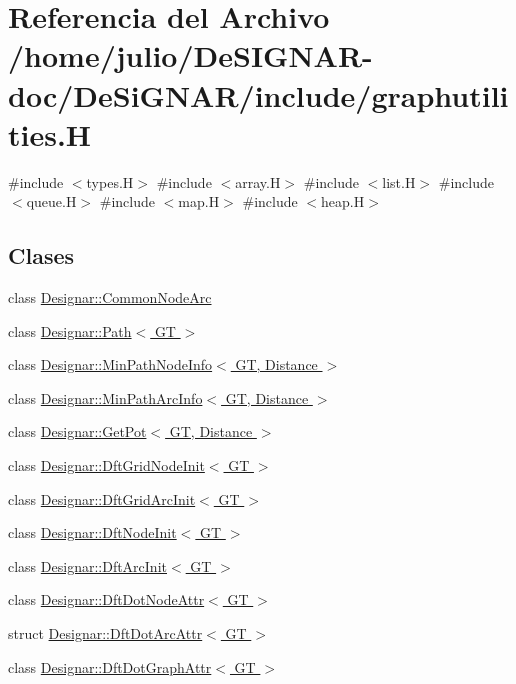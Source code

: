 \hypertarget{graphutilities_8_h}{}\section{Referencia del Archivo /home/julio/\+De\+S\+I\+G\+N\+A\+R-\/doc/\+De\+Si\+G\+N\+A\+R/include/graphutilities.H}
\label{graphutilities_8_h}
{\ttfamily \#include $<$types.\+H$>$}\newline
{\ttfamily \#include $<$array.\+H$>$}\newline
{\ttfamily \#include $<$list.\+H$>$}\newline
{\ttfamily \#include $<$queue.\+H$>$}\newline
{\ttfamily \#include $<$map.\+H$>$}\newline
{\ttfamily \#include $<$heap.\+H$>$}\newline
\subsection*{Clases}
\begin{DoxyCompactItemize}
\item 
class \hyperlink{class_designar_1_1_common_node_arc}{Designar\+::\+Common\+Node\+Arc}
\item 
class \hyperlink{class_designar_1_1_path}{Designar\+::\+Path$<$ G\+T $>$}
\item 
class \hyperlink{class_designar_1_1_min_path_node_info}{Designar\+::\+Min\+Path\+Node\+Info$<$ G\+T, Distance $>$}
\item 
class \hyperlink{class_designar_1_1_min_path_arc_info}{Designar\+::\+Min\+Path\+Arc\+Info$<$ G\+T, Distance $>$}
\item 
class \hyperlink{class_designar_1_1_get_pot}{Designar\+::\+Get\+Pot$<$ G\+T, Distance $>$}
\item 
class \hyperlink{class_designar_1_1_dft_grid_node_init}{Designar\+::\+Dft\+Grid\+Node\+Init$<$ G\+T $>$}
\item 
class \hyperlink{class_designar_1_1_dft_grid_arc_init}{Designar\+::\+Dft\+Grid\+Arc\+Init$<$ G\+T $>$}
\item 
class \hyperlink{class_designar_1_1_dft_node_init}{Designar\+::\+Dft\+Node\+Init$<$ G\+T $>$}
\item 
class \hyperlink{class_designar_1_1_dft_arc_init}{Designar\+::\+Dft\+Arc\+Init$<$ G\+T $>$}
\item 
class \hyperlink{class_designar_1_1_dft_dot_node_attr}{Designar\+::\+Dft\+Dot\+Node\+Attr$<$ G\+T $>$}
\item 
struct \hyperlink{struct_designar_1_1_dft_dot_arc_attr}{Designar\+::\+Dft\+Dot\+Arc\+Attr$<$ G\+T $>$}
\item 
class \hyperlink{class_designar_1_1_dft_dot_graph_attr}{Designar\+::\+Dft\+Dot\+Graph\+Attr$<$ G\+T $>$}
\end{DoxyCompactItemize}
